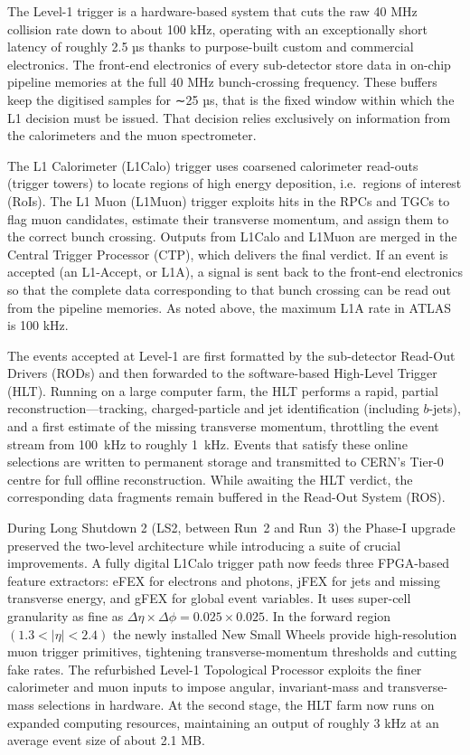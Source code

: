 The Level-1 trigger is a hardware-based system that cuts the raw 40 MHz collision rate down to about 100 kHz, operating with an exceptionally short latency of roughly 2.5 µs thanks to purpose-built custom and commercial electronics. The front-end electronics of every sub-detector store data in on-chip pipeline memories at the full 40 MHz bunch-crossing frequency. These buffers keep the digitised samples for ∼25 µs, that is the fixed window within which the L1 decision must be issued. That decision relies exclusively on information from the calorimeters and the muon spectrometer.

The L1 Calorimeter (L1Calo) trigger uses coarsened calorimeter read-outs (trigger towers) to locate regions of high energy deposition, i.e.\ regions of interest (RoIs). The L1 Muon (L1Muon) trigger exploits hits in the RPCs and TGCs to flag muon candidates, estimate their transverse momentum, and assign them to the correct bunch crossing. Outputs from L1Calo and L1Muon are merged in the Central Trigger Processor (CTP), which delivers the final verdict. If an event is accepted (an L1-Accept, or L1A), a signal is sent back to the front-end electronics so that the complete data corresponding to that bunch crossing can be read out from the pipeline memories. As noted above, the maximum L1A rate in ATLAS is 100 kHz.

The events accepted at Level-1 are first formatted by the sub-detector Read-Out Drivers (RODs) and then forwarded to the software-based High-Level Trigger (HLT). Running on a large computer farm, the HLT performs a rapid, partial reconstruction—tracking, charged-particle and jet identification (including $b$-jets), and a first estimate of the missing transverse momentum, throttling the event stream from \SI{100}{\kilo\hertz} to roughly \SI{1}{\kilo\hertz}. Events that satisfy these online selections are written to permanent storage and transmitted to CERN’s Tier-0 centre for full offline reconstruction. While awaiting the HLT verdict, the corresponding data fragments remain buffered in the Read-Out System (ROS).

During Long Shutdown 2 (LS2, between Run~2 and Run~3) the Phase-I upgrade preserved the two-level architecture while introducing a suite of crucial improvements. A fully digital L1Calo trigger path now feeds three FPGA-based feature extractors: eFEX for electrons and photons, jFEX for jets and missing transverse energy, and gFEX for global event variables. It uses super-cell granularity as fine as $\Delta\eta\times\Delta\phi = 0.025\times0.025$. In the forward region $(1.3<|\eta|<2.4)$ the newly installed New Small Wheels provide high-resolution muon trigger primitives, tightening transverse-momentum thresholds and cutting fake rates. The refurbished Level-1 Topological Processor exploits the finer calorimeter and muon inputs to impose angular, invariant-mass and transverse-mass selections in hardware. At the second stage, the HLT farm now runs on expanded computing resources, maintaining an output of roughly 3 kHz at an average event size of about 2.1 MB.

